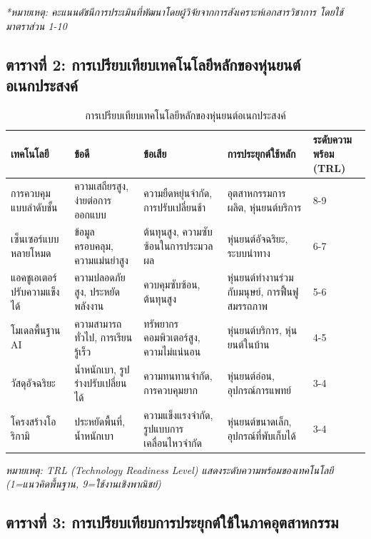 \documentclass[a4paper]{article}
\begin{document}
\textit{*หมายเหตุ: คะแนนดัชนีการประเมินที่พัฒนาโดยผู้วิจัยจากการสังเคราะห์เอกสารวิชาการ โดยใช้มาตราส่วน 1-10}

\clearpage
\subsection{ตารางที่ 2: การเปรียบเทียบเทคโนโลยีหลักของหุ่นยนต์อเนกประสงค์}

\begin{table}[!htbp]
\centering
\small
\caption{การเปรียบเทียบเทคโนโลยีหลักของหุ่นยนต์อเนกประสงค์}
\begin{tabular}{|p{3cm}|p{3cm}|p{3cm}|p{3cm}|p{2.5cm}|}
\hline
\textbf{เทคโนโลยี} & \textbf{ข้อดี} & \textbf{ข้อเสีย} & \textbf{การประยุกต์ใช้หลัก} & \textbf{ระดับความพร้อม (TRL)} \\
\hline
การควบคุมแบบลำดับชั้น & ความเสถียรสูง, ง่ายต่อการออกแบบ & ความยืดหยุ่นจำกัด, การปรับเปลี่ยนช้า & อุตสาหกรรมการผลิต, หุ่นยนต์บริการ & 8-9 \\
\hline
เซ็นเซอร์แบบหลายโหมด & ข้อมูลครอบคลุม, ความแม่นยำสูง & ต้นทุนสูง, ความซับซ้อนในการประมวลผล & หุ่นยนต์อัจฉริยะ, ระบบนำทาง & 6-7 \\
\hline
แอคชูเอเตอร์ปรับความแข็งได้ & ความปลอดภัยสูง, ประหยัดพลังงาน & ควบคุมซับซ้อน, ต้นทุนสูง & หุ่นยนต์ทำงานร่วมกับมนุษย์, การฟื้นฟูสมรรถภาพ & 5-6 \\
\hline
โมเดลพื้นฐาน AI & ความสามารถทั่วไป, การเรียนรู้เร็ว & ทรัพยากรคอมพิวเตอร์สูง, ความไม่แน่นอน & หุ่นยนต์บริการ, หุ่นยนต์ในบ้าน & 4-5 \\
\hline
วัสดุอัจฉริยะ & น้ำหนักเบา, รูปร่างปรับเปลี่ยนได้ & ความทนทานจำกัด, การควบคุมยาก & หุ่นยนต์อ่อน, อุปกรณ์การแพทย์ & 3-4 \\
\hline
โครงสร้างโอริกามิ & ประหยัดพื้นที่, น้ำหนักเบา & ความแข็งแรงจำกัด, รูปแบบการเคลื่อนไหวจำกัด & หุ่นยนต์ขนาดเล็ก, อุปกรณ์ที่พับเก็บได้ & 3-4 \\
\hline
\end{tabular}
\end{table}

\textit{หมายเหตุ: TRL (Technology Readiness Level) แสดงระดับความพร้อมของเทคโนโลยี (1=แนวคิดพื้นฐาน, 9=ใช้งานเชิงพาณิชย์)}

\subsection{ตารางที่ 3: การเปรียบเทียบการประยุกต์ใช้ในภาคอุตสาหกรรม}
\end{document}
